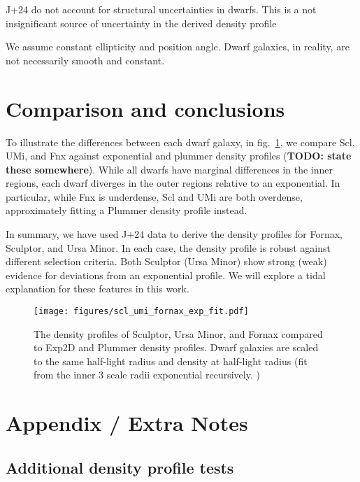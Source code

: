 J+24 do not account for structural uncertainties in dwarfs. This is a
not insignificant source of uncertainty in the derived density profile

We assume constant ellipticity and position angle. Dwarf galaxies, in
reality, are not necessarily smooth and constant.

\section{Comparison and conclusions}\label{comparison-and-conclusions}

To illustrate the differences between each dwarf galaxy, in
fig.~\ref{fig:classical_dwarfs_densities}, we compare Scl, UMi, and Fnx
against exponential and plummer density profiles (\textbf{TODO: state
these somewhere}). While all dwarfs have marginal differences in the
inner regions, each dwarf diverges in the outer regions relative to an
exponential. In particular, while Fnx is underdense, Scl and UMi are
both overdense, approximately fitting a Plummer density profile instead.

In summary, we have used J+24 data to derive the density profiles for
Fornax, Sculptor, and Ursa Minor. In each case, the density profile is
robust against different selection criteria. Both Sculptor (Ursa Minor)
show strong (weak) evidence for deviations from an exponential profile.
We will explore a tidal explanation for these features in this work.

\begin{figure}
\centering
\texttt{[image: figures/scl\_umi\_fornax\_exp\_fit.pdf]}
\caption[Classical dwarf density profiles]{The density profiles of
Sculptor, Ursa Minor, and Fornax compared to Exp2D and Plummer density
profiles. Dwarf galaxies are scaled to the same half-light radius and
density at half-light radius (fit from the inner 3 scale radii
exponential recursively. )}\label{fig:classical_dwarfs_densities}
\end{figure}

\section{Appendix / Extra Notes}\label{appendix-extra-notes}

\subsection{Additional density profile
tests}\label{additional-density-profile-tests}

